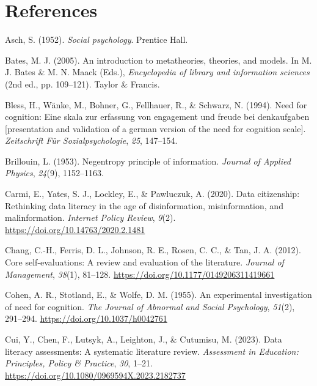 \documentclass[
  12pt,
  a4paper,
  twoside]{article}
\newlength{\cslhangindent}
\newlength{\cslentryspacingunit} %
\newenvironment{CSLReferences}[2] %
 {%
  \setlength{\parindent}{0pt}
  \ifodd #1
  \let\oldpar\par
  \def\par{\hangindent=\cslhangindent\oldpar}
  \fi
  \setlength{\parskip}{#2\cslentryspacingunit}
 }%
 {}
\begin{document}
\hypertarget{references}{%
\section*{References}\label{references}}

\hypertarget{refs}{}
\begin{CSLReferences}{1}{0}
\leavevmode{}%
Asch, S. (1952). \emph{Social psychology}. Prentice Hall.

\leavevmode{}%
Bates, M. J. (2005). An introduction to metatheories, theories, and models. In M. J. Bates \& M. N. Maack (Eds.), \emph{Encyclopedia of library and information sciences} (2nd ed., pp. 109--121). Taylor \& Francis.

\leavevmode{}%
Bless, H., Wänke, M., Bohner, G., Fellhauer, R., \& Schwarz, N. (1994). Need for cognition: Eine skala zur erfassung von engagement und freude bei denkaufgaben {[}presentation and validation of a german version of the need for cognition scale{]}. \emph{Zeitschrift Für Sozialpsychologie}, \emph{25}, 147--154.

\leavevmode{}%
Brillouin, L. (1953). Negentropy principle of information. \emph{Journal of Applied Physics}, \emph{24}(9), 1152--1163.

\leavevmode{}%
Carmi, E., Yates, S. J., Lockley, E., \& Pawluczuk, A. (2020). Data citizenship: Rethinking data literacy in the age of disinformation, misinformation, and malinformation. \emph{Internet Policy Review}, \emph{9}(2). \url{https://doi.org/10.14763/2020.2.1481}

\leavevmode{}%
Chang, C.-H., Ferris, D. L., Johnson, R. E., Rosen, C. C., \& Tan, J. A. (2012). Core self-evaluations: A review and evaluation of the literature. \emph{Journal of Management}, \emph{38}(1), 81--128. \url{https://doi.org/10.1177/0149206311419661}

\leavevmode{}%
Cohen, A. R., Stotland, E., \& Wolfe, D. M. (1955). An experimental investigation of need for cognition. \emph{The Journal of Abnormal and Social Psychology}, \emph{51}(2), 291--294. \url{https://doi.org/10.1037/h0042761}

\leavevmode{}%
Cui, Y., Chen, F., Lutsyk, A., Leighton, J., \& Cutumisu, M. (2023). Data literacy assessments: A systematic literature review. \emph{Assessment in Education: Principles, Policy \& Practice}, \emph{30}, 1--21. \url{https://doi.org/10.1080/0969594X.2023.2182737}


\end{CSLReferences}
\end{document}
